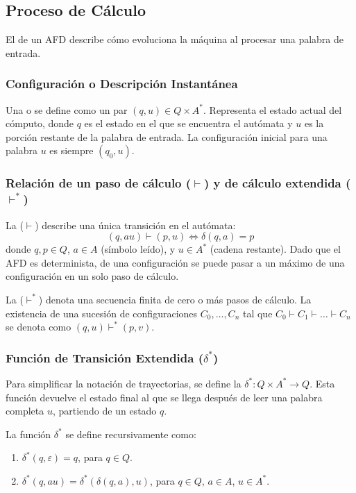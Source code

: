 \subsection{Proceso de Cálculo} %

El  de un AFD describe cómo evoluciona la máquina al procesar una palabra de entrada.

\subsubsection{Configuración o Descripción Instantánea} %
Una  o  se define como un par $(q, u) \in Q \times A^*$. Representa el estado actual del cómputo, donde $q$ es el estado en el que se encuentra el autómata y $u$ es la porción restante de la palabra de entrada. La configuración inicial para una palabra $u$ es siempre $(q_0, u)$.

\subsubsection{Relación de un paso de cálculo ($\vdash$) y de cálculo extendida ($\vdash^*$)} %
La  ($\vdash$) describe una única transición en el autómata:
\[ (q, au) \vdash (p, u) \iff \delta(q, a) = p \]
donde $q, p \in Q$, $a \in A$ (símbolo leído), y $u \in A^*$ (cadena restante). Dado que el AFD es determinista, de una configuración se puede pasar a un máximo de una configuración en un solo paso de cálculo.

La  ($\vdash^*$) denota una secuencia finita de cero o más pasos de cálculo. La existencia de una sucesión de configuraciones $C_0, \dots, C_n$ tal que $C_0 \vdash C_1 \vdash \dots \vdash C_n$ se denota como $(q, u) \vdash^* (p, v)$.

\subsubsection{Función de Transición Extendida ($\delta^*$)} %
Para simplificar la notación de trayectorias, se define la  $\delta^*: Q \times A^* \to Q$. Esta función devuelve el estado final al que se llega después de leer una palabra completa $u$, partiendo de un estado $q$.

\begin{definicion}
La función $\delta^*$ se define recursivamente como:
\begin{enumerate}
    \item {} $\delta^*(q, \varepsilon) = q$, para $q \in Q$.
    \item {} $\delta^*(q, au) = \delta^*(\delta(q, a), u)$, para $q \in Q$, $a \in A$, $u \in A^*$.
\end{enumerate}
\end{definicion}

